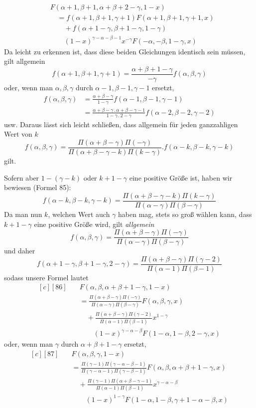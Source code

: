 \[
\begin{aligned}
&F(\alpha+1,\beta+1,\alpha+\beta+2-\gamma,1-x)\\
&\quad=f(\alpha+1,\beta+1,\gamma+1)F(\alpha+1,\beta+1,\gamma+1,x)\\
&\qquad+f(\alpha+1-\gamma,\beta+1-\gamma,1-\gamma)\\&\qquad(1-x)^{\gamma-\alpha-\beta-1}x^{-\gamma}F(-\alpha,-\beta,1-\gamma,x)
\end{aligned}
\]
Da leicht zu erkennen ist, dass diese beiden Gleichungen identisch sein müssen, gilt allgemein
\[
f(\alpha+1,\beta+1,\gamma+1)=\frac{\alpha+\beta+1-\gamma}{-\gamma}f(\alpha,\beta,\gamma)
\]
oder, wenn man \(\alpha,\beta,\gamma\) durch \(\alpha-1,\beta-1,\gamma-1\) ersetzt,
\[
\begin{aligned}
f(\alpha,\beta,\gamma)&=\frac{\alpha+\beta-\gamma}{1-\gamma}f(\alpha-1,\beta-1,\gamma-1)\\
&=\frac{\alpha+\beta-\gamma\,.\,\alpha+\beta-\gamma-1}{1-\gamma\,.\,2-\gamma}f(\alpha-2,\beta-2,\gamma-2)
\end{aligned}
\]
usw. Daraus lässt sich leicht schließen, dass allgemein für jeden ganzzahligen Wert von \(k\)
\[
f(\alpha,\beta,\gamma)=\frac{\Pi(\alpha+\beta-\gamma)\Pi(-\gamma)}{\Pi(\alpha+\beta-\gamma-k)\Pi(k-\gamma)}.f(\alpha-k,\beta-k,\gamma-k)
\]
gilt.
\par{}
Sofern aber $1-(\gamma-k)$ oder $k+1-\gamma$ eine positive Größe ist, haben wir bewiesen (Formel 85):
\[
f(\alpha-k,\beta-k,\gamma-k)
=\frac{\Pi(\alpha+\beta-\gamma-k)\Pi(k-\gamma)}{\Pi(\alpha-\gamma)\Pi(\beta-\gamma)}
\]
Da man nun $k$, welchen Wert auch $\gamma$ haben mag, stets so groß wählen kann, dass $k+1-\gamma$ eine positive Größe wird, gilt \textit{allgemein}
\[
f(\alpha,\beta,\gamma)
=\frac{\Pi(\alpha+\beta-\gamma)\Pi(-\gamma)}{\Pi(\alpha-\gamma)\Pi(\beta-\gamma)}
\]
und daher
\[
f(\alpha+1-\gamma,\beta+1-\gamma,2-\gamma)
=\frac{\Pi(\alpha+\beta-\gamma)\Pi(\gamma-2)}{\Pi(\alpha-1)\Pi(\beta-1)}
\]
sodass unsere Formel lautet
\[
\begin{aligned}[c]
[86]\quad &F(\alpha,\beta,\alpha+\beta+1-\gamma,1-x)\\
&=\frac{\Pi(\alpha+\beta-\gamma)\Pi(-\gamma)}{\Pi(\alpha-\gamma)\Pi(\beta-\gamma)}F(\alpha,\beta,\gamma,x)\\
&\quad+\frac{\Pi(\alpha+\beta-\gamma)\Pi(\gamma-2)}{\Pi(\alpha-1)\Pi(\beta-1)}x^{1-\gamma}\\&\qquad(1-x)^{\gamma-\alpha-\beta}F(1-\alpha,1-\beta,2-\gamma,x)
\end{aligned}
\]
oder, wenn man $\gamma$ durch $\alpha+\beta+1-\gamma$ ersetzt,
\[
\begin{aligned}[c]
[87]\quad &F(\alpha,\beta,\gamma,1-x)\\
&=\frac{\Pi(\gamma-1)\Pi(\gamma-\alpha-\beta-1)}{\Pi(\gamma-\alpha-1)\Pi(\gamma-\beta-1)}F(\alpha,\beta,\alpha+\beta+1-\gamma,x)\\
&\quad+\frac{\Pi(\gamma-1)\Pi(\alpha+\beta-\gamma-1)}{\Pi(\alpha-1)\Pi(\beta-1)}x^{\gamma-\alpha-\beta}\\&\qquad(1-x)^{1-\gamma}F(1-\alpha,1-\beta,\gamma+1-\alpha-\beta,x)
\end{aligned}
\]


